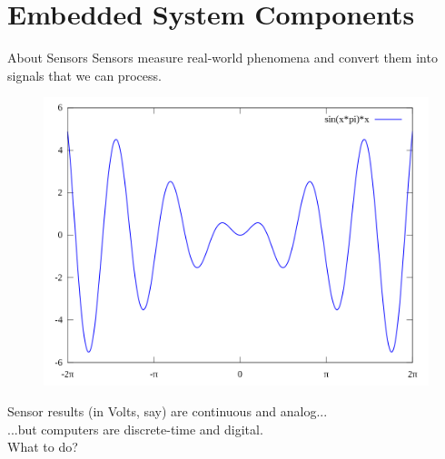 \documentclass[aspectratio=169]{beamer}
\begin{document}
\section{Embedded System Components}	



	\begin{frame}[t]{About Sensors}
		\small Sensors measure real-world phenomena and convert them into signals that we can process.	\\
		\vspace{0.5em}
		\begin{figure}
			\centering
			\includegraphics[width=\textwidth,height=0.6\textheight,keepaspectratio]{img/sine.png}
		\end{figure}
		Sensor results (in Volts, say) are continuous and analog...	\\	
		\hspace{2em}...but computers are discrete-time and digital. \\	
		\vspace{2em}		
		What to do? \\
	\end{frame}
\end{document}
